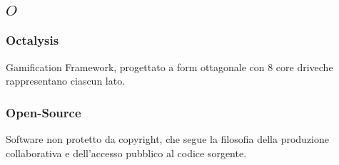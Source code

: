 \subsection*{\quad$O\quad$}
\subsubsection*{Octalysis}
Gamification Framework, progettato a form ottagonale con 8 core drive\glosp che rappresentano ciascun lato.
\subsubsection*{Open-Source}
Software non protetto da copyright, che segue la filosofia della produzione collaborativa e dell'accesso pubblico al codice sorgente.

